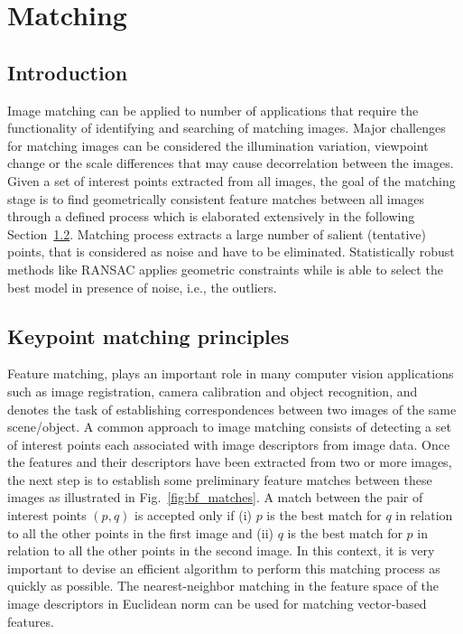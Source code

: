 \chapter{Matching}\label{matching}


\section{Introduction}

Image matching can be applied to number of applications that require the functionality of identifying and searching of matching images. 
Major challenges for matching images can be considered the illumination variation, viewpoint change or the scale differences that may cause decorrelation between the images. 
Given a set of interest points  extracted from all images, the goal of the matching stage is to find geometrically consistent feature matches between all images through a defined process which is elaborated extensively in the following Section~\ref{imgmatching}. 
Matching process extracts a large number of salient (tentative) points, that is considered as noise and have to be eliminated.
Statistically robust methods like RANSAC applies geometric constraints while is able to select the best model in presence of noise, i.e., the outliers.


\section{Keypoint matching principles}\label{imgmatching}

Feature matching, 
plays an important role in many computer vision
applications such as image registration, camera calibration and object recognition, and denotes the task of establishing correspondences between two images of the same
scene/object. A common approach to image matching consists of detecting a set of interest points each associated with image descriptors from image data. Once the features and their descriptors have been extracted from two or more images, the next step is to establish some preliminary feature matches between these images as illustrated in Fig.~\ref{fig:bf_matches}.
A match between the pair of interest points $(p, q)$ is accepted only if (i) $p$ is the best match for $q$ in relation to all the other points in the first image and (ii) $q$ is the best match for $p$ in relation to all the other points in the second image. In this context, it is very important to devise an efficient algorithm to perform this
matching process as quickly as possible. The nearest-neighbor matching in the feature
space of the image descriptors in Euclidean norm can be used for matching vector-based features. 

